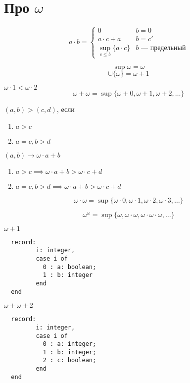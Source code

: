 \documentclass[english]{article}
\begin{document}
\section{Про \(\omega\)}
\label{sec:orgb96b907}
\begin{definition}
	\[ a \cdot b = \begin{cases}
			0                           & b = 0                   \\
			a\cdot c + a                & b = c'                  \\
			\sup_{c \le b}\{a \cdot c\} & b\text{ --- предельный}
		\end{cases} \]
	\label{org8671887}
\end{definition}
\begin{remark}
	\[ \sup \omega = \omega \]
	\[ \cup \{\omega\} = \omega + 1 \]
\end{remark}
\begin{examp}
	\(\omega \cdot 1 < \omega \cdot 2\)
	\[ \omega + \omega = \sup \{\omega + 0, \omega + 1, \omega + 2, \dots\} \]
\end{examp}
\begin{examp}
	\((a, b) > (c, d)\), если
	\begin{enumerate}
		\item \(a > c\)
		\item \(a = c, b > d\)
	\end{enumerate}
	\((a, b) \to \omega \cdot a + b\)
	\begin{enumerate}
		\item \(a > c \implies \omega \cdot a + b > \omega \cdot c + d\)
		\item \(a = c, b > d \implies \omega \cdot a + b > \omega \cdot c + d\) \fixme
	\end{enumerate}
\end{examp}
\begin{examp}
	\[ \omega \cdot \omega = \sup \{\omega \cdot 0, \omega \cdot 1, \omega \cdot 2, \omega \cdot 3, \dots\} \]
\end{examp}
\begin{examp}
	\[ \omega^\omega = \sup \{\omega, \omega \cdot \omega, \omega \cdot \omega \cdot \omega, \dots\} \]
\end{examp}
\begin{examp}
	\(\omega + 1\)
	\begin{verbatim}
  record:
         i: integer,
         case i of
           0 : a: boolean;
           1 : b: integer
         end
  end
\end{verbatim}
	\fixme
\end{examp}
\begin{examp}
	\(\omega + \omega + 2\)
	\begin{verbatim}
  record:
         i: integer,
         case i of
           0 : a: integer;
           1 : b: integer;
           2 : c: boolean;
         end
  end
\end{verbatim}
\end{examp}
\end{document}
